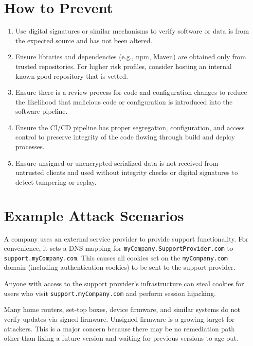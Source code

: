 \documentclass[11pt]{article}
\begin{document}
\section{How to Prevent}

\begin{controlbox}
\begin{enumerate}
  \item Use digital signatures or similar mechanisms to verify software or data is from the expected source and has not been altered.
  \item Ensure libraries and dependencies (e.g., npm, Maven) are obtained only from trusted repositories. For higher risk profiles, consider hosting an internal known-good repository that is vetted.
  \item Ensure there is a review process for code and configuration changes to reduce the likelihood that malicious code or configuration is introduced into the software pipeline.
  \item Ensure the CI/CD pipeline has proper segregation, configuration, and access control to preserve integrity of the code flowing through build and deploy processes.
  \item Ensure unsigned or unencrypted serialized data is not received from untrusted clients and used without integrity checks or digital signatures to detect tampering or replay.
\end{enumerate}
\end{controlbox}

\section{Example Attack Scenarios}

\begin{scenario}
A company uses an external service provider to provide support functionality. For convenience, it sets a DNS mapping for \texttt{myCompany.SupportProvider.com} to \texttt{support.myCompany.com}. This causes all cookies set on the \texttt{myCompany.com} domain (including authentication cookies) to be sent to the support provider.

Anyone with access to the support provider’s infrastructure can steal cookies for users who visit \texttt{support.myCompany.com} and perform session hijacking.
\end{scenario}

\begin{scenario}
Many home routers, set-top boxes, device firmware, and similar systems do not verify updates via signed firmware. Unsigned firmware is a growing target for attackers. This is a major concern because there may be no remediation path other than fixing a future version and waiting for previous versions to age out.
\end{scenario}
\end{document}
